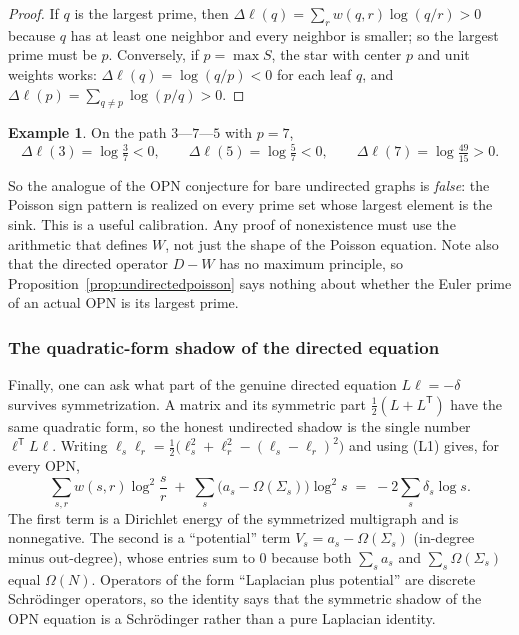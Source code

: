 \documentclass[11pt]{article}
\theoremstyle{definition}
\newtheorem{example}[theorem]{Example}
\theoremstyle{remark}
\begin{document}
\begin{proof}
If $q$ is the largest prime, then $\Delta\ell(q)=\sum_r w(q,r)\log(q/r)>0$
because $q$ has at least one neighbor and every neighbor is smaller; so the
largest prime must be $p$.  Conversely, if $p=\max S$, the star with center
$p$ and unit weights works: $\Delta\ell(q)=\log(q/p)<0$ for each leaf $q$, and
$\Delta\ell(p)=\sum_{q\ne p}\log(p/q)>0$.
\end{proof}

\begin{example}
On the path $3$---$7$---$5$ with $p=7$,
\[
\Delta\ell(3)=\log\tfrac37<0,\qquad
\Delta\ell(5)=\log\tfrac57<0,\qquad
\Delta\ell(7)=\log\tfrac{49}{15}>0 .
\]
\end{example}

So the analogue of the OPN conjecture for bare undirected graphs is
\emph{false}: the Poisson sign pattern is realized on every prime set whose
largest element is the sink.  This is a useful calibration.  Any proof of
nonexistence must use the arithmetic that defines $W$, not just the shape of
the Poisson equation.  Note also that the directed operator $D-W$ has no
maximum principle, so Proposition~\ref{prop:undirectedpoisson} says nothing
about whether the Euler prime of an actual OPN is its largest prime.

\subsubsection{The quadratic-form shadow of the directed equation}

Finally, one can ask what part of the genuine directed equation $L\ell=-\delta$
survives symmetrization.  A matrix and its symmetric part
$\tfrac12(L+L^{\mathsf T})$ have the same quadratic form, so the honest
undirected shadow is the single number $\ell^{\mathsf T}L\ell$.  Writing
$\ell_s\ell_r=\tfrac12\bigl(\ell_s^2+\ell_r^2-(\ell_s-\ell_r)^2\bigr)$ and
using (L1) gives, for every OPN,
\[
\boxed{
\sum_{s,r}w(s,r)\log^2\frac sr
\;+\;\sum_s\bigl(a_s-\Omega(\Sigma_s)\bigr)\log^2 s
\;=\;-2\sum_s\delta_s\log s .}
\]
The first term is a Dirichlet energy of the symmetrized multigraph and is
nonnegative.  The second is a ``potential'' term
$V_s=a_s-\Omega(\Sigma_s)$ (in-degree minus out-degree), whose entries sum to
$0$ because both $\sum_s a_s$ and $\sum_s\Omega(\Sigma_s)$ equal $\Omega(N)$.
Operators of the form ``Laplacian plus potential'' are discrete
Schr\"odinger operators, so the identity says that the symmetric shadow of the
OPN equation is a Schr\"odinger rather than a pure Laplacian identity.
\end{document}
